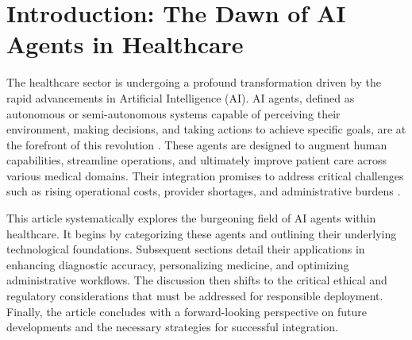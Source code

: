 \documentclass[12pt,a4paper]{article}
\begin{document}
\begin{abstract}
Artificial Intelligence (AI) agents are rapidly transforming the healthcare landscape, offering unprecedented opportunities to enhance efficiency and patient outcomes. This article explores the diverse applications of AI agents, ranging from diagnostic support systems to personalized treatment planners and robotic surgical assistants. It delves into the core technologies enabling these autonomous or semi-autonomous systems, including deep learning, natural language processing, and advanced sensor fusion. The integration of AI agents significantly improves diagnostic accuracy and speed, particularly in medical image analysis and early disease detection. Furthermore, AI agents are revolutionizing personalized medicine by analyzing vast patient data to recommend tailored treatments and preventive strategies. While these advancements promise substantial benefits, their successful and ethical integration hinges on robust regulatory frameworks, transparent algorithmic design, and a proactive approach to addressing inherent biases. This article argues that ensuring patient trust and accountability for errors is paramount for the responsible deployment of AI agents in healthcare.
\end{abstract}

\section{Introduction: The Dawn of AI Agents in Healthcare}
\label{sec:introduction}
The healthcare sector is undergoing a profound transformation driven by the rapid advancements in Artificial Intelligence (AI). AI agents, defined as autonomous or semi-autonomous systems capable of perceiving their environment, making decisions, and taking actions to achieve specific goals, are at the forefront of this revolution \cite{russell2010artificial}. These agents are designed to augment human capabilities, streamline operations, and ultimately improve patient care across various medical domains. Their integration promises to address critical challenges such as rising operational costs, provider shortages, and administrative burdens \cite{who2021ai}.

This article systematically explores the burgeoning field of AI agents within healthcare. It begins by categorizing these agents and outlining their underlying technological foundations. Subsequent sections detail their applications in enhancing diagnostic accuracy, personalizing medicine, and optimizing administrative workflows. The discussion then shifts to the critical ethical and regulatory considerations that must be addressed for responsible deployment. Finally, the article concludes with a forward-looking perspective on future developments and the necessary strategies for successful integration.
\end{document}

